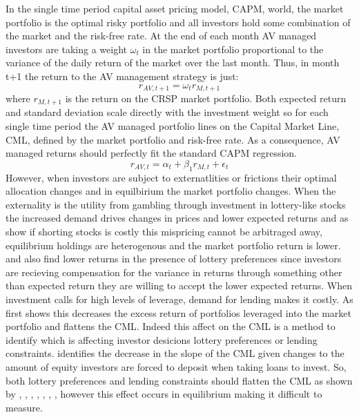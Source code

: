 In the single time period capital asset pricing model, CAPM, world, the market portfolio is the optimal risky portfolio and all investors hold some combination of the market and the risk-free rate. \cite{sharpe_capital_1964,lintner_valuation_1965} At the end of each month AV managed investors are taking a weight $\omega_{t}$ in the market portfolio proportional to the variance of the daily return of the market over the last month. Thus, in month t+1 the return to the AV management strategy is just:
\begin{equation} 
	r_{AV,t+1} = \omega_{t}r_{M,t+1}
\end{equation}
where $r_{M,t+1}$ is the return on the CRSP market portfolio. Both expected return and standard deviation scale directly with the investment weight so for each single time period the AV managed portfolio lines on the Capital Market Line, CML, defined by the market portfolio and risk-free rate. 
As a consequence, AV managed returns should perfectly fit the standard CAPM regression.
\begin{equation} \label{eq:eq_returns}
	r_{AV,t} = \alpha_{t} + \beta_{1}r_{M,t} + \epsilon_{t}
\end{equation}
However, when investors are subject to externatlities or frictions their optimal allocation changes and in equilbirium the market portfolio changes. When the externality is the utility from gambling through investment in lottery-like stocks the increased demand drives changes in prices and lower expected returns and as \citet{barberis_stocks_2008} show if shorting stocks is costly this mispricing cannot be arbitraged away, equilibrium holdings are heterogenous and the market portfolio return is lower. \citet{kumar_who_2009} and \citet{fong_risk_2013} also find lower returns in the presence of lottery preferences since investors are recieving compensation for the variance in returns through something other than expected return they are willing to accept the lower expected returns. When investment calls for high levels of leverage, demand for lending makes it costly. As \citet{black1972capital} first shows this decreases the excess return of portfolios leveraged into the market portfolio and flattens the CML. Indeed this affect on the CML is a method to identify which is affecting investor desicions lottery preferences or lending constraints. \citet{jylha_margin_2018} identifies the decrease in the slope of the CML given changes to the amount of equity investors are forced to deposit when taking loans to invest. So, both lottery preferences and lending constraints should flatten the CML as shown by \citet{barberis_stocks_2008}, \citet{kumar_who_2009}, \citet{fong_risk_2013}, \citet{bali_lottery-demand-based_2017}, \citet{black1972capital}, \citet{frazzini_betting_2014}, \citet{jylha_margin_2018}, however this effect occurs in equilibrium making it difficult to measure. %
